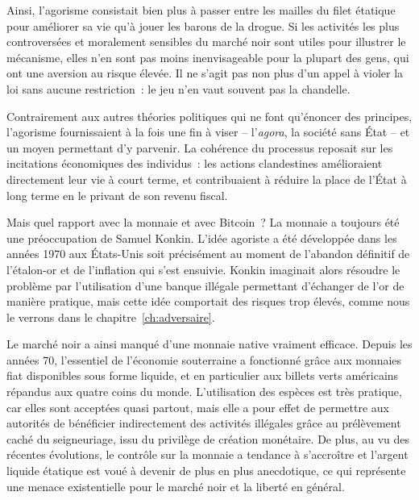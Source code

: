 Ainsi, l'agorisme consistait bien plus à passer entre les mailles du filet étatique pour améliorer sa vie qu'à jouer les barons de la drogue. Si les activités les plus controversées et moralement sensibles du marché noir sont utiles pour illustrer le mécanisme, elles n'en sont pas moins inenvisageable pour la plupart des gens, qui ont une aversion au risque élevée. Il ne s'agit pas non plus d'un appel à violer la loi sans aucune restriction~: le jeu n'en vaut souvent pas la chandelle.

Contrairement aux autres théories politiques qui ne font qu'énoncer des principes, l'agorisme fournissaient à la fois une fin à viser -- l'\emph{agora}, la société sans État -- et un moyen permettant d'y parvenir. La cohérence du processus reposait sur les incitations économiques des individus~: les actions clandestines amélioraient directement leur vie à court terme, et contribuaient à réduire la place de l'État à long terme en le privant de son revenu fiscal.


Mais quel rapport avec la monnaie et avec Bitcoin~? La monnaie a toujours été une préoccupation de Samuel Konkin. L'idée agoriste a été développée dans les années 1970 aux États-Unis soit précisément au moment de l'abandon définitif de l'étalon-or et de l'inflation qui s'est ensuivie. Konkin imaginait alors résoudre le problème par l'utilisation d'une banque illégale permettant d'échanger de l'or de manière pratique, mais cette idée comportait des risques trop élevés, comme nous le verrons dans le chapitre~\ref{ch:adversaire}.

Le marché noir a ainsi manqué d'une monnaie native vraiment efficace. Depuis les années 70, l'essentiel de l'économie souterraine a fonctionné grâce aux monnaies fiat disponibles sous forme liquide, et en particulier aux billets verts américains répandus aux quatre coins du monde. L'utilisation des espèces est très pratique, car elles sont acceptées quasi partout, mais elle a pour effet de permettre aux autorités de bénéficier indirectement des activités illégales grâce au prélèvement caché du seigneuriage, issu du privilège de création monétaire. De plus, au vu des récentes évolutions, le contrôle sur la monnaie a tendance à s'accroître et l'argent liquide étatique est voué à devenir de plus en plus anecdotique, ce qui représente une menace existentielle pour le marché noir et la liberté en général.

